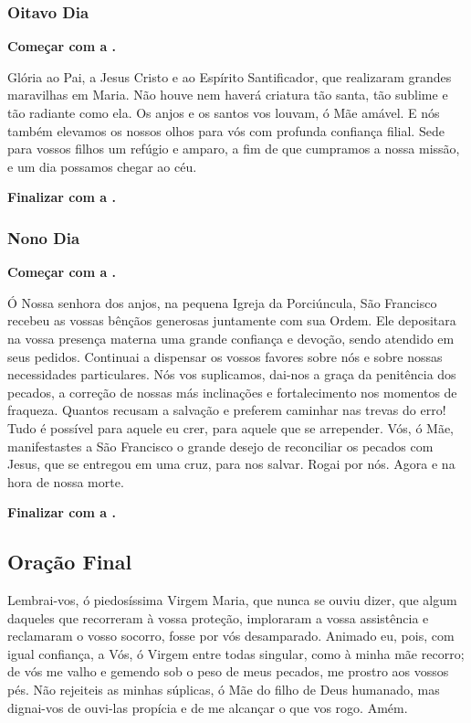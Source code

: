 \documentclass[a4paper,12pt]{extarticle} \usepackage[utf8]{inputenc}
\begin{document}
\subsubsection{Oitavo Dia}

\textbf{Começar com a .}


Glória ao Pai, a Jesus Cristo e ao Espírito Santificador, que realizaram grandes maravilhas em Maria. Não houve nem haverá criatura tão santa, tão sublime e tão radiante como ela. Os anjos e os santos vos louvam, ó Mãe amável. E nós também elevamos os nossos olhos para vós com profunda confiança filial. Sede para vossos filhos um refúgio e amparo, a fim de que cumpramos a nossa missão, e um dia possamos chegar ao céu.


\textbf{Finalizar com a .}


\subsubsection{Nono Dia}

\textbf{Começar com a .}

Ó Nossa senhora dos anjos, na pequena Igreja da Porciúncula, São Francisco recebeu as vossas bênçãos generosas juntamente com sua Ordem. Ele depositara na vossa presença materna uma grande confiança e devoção, sendo atendido em seus pedidos. Continuai a dispensar os vossos favores sobre nós e sobre nossas necessidades particulares. Nós vos suplicamos, dai-nos a graça da penitência dos pecados, a correção de nossas más inclinações e fortalecimento nos momentos de fraqueza. Quantos recusam a salvação e preferem caminhar nas trevas do erro! Tudo é possível para aquele eu crer, para aquele que se arrepender. Vós, ó Mãe, manifestastes a São Francisco o grande desejo de reconciliar os pecados com Jesus, que se entregou em uma cruz, para nos salvar. Rogai por nós. Agora e na hora de nossa morte.

\textbf{Finalizar com a .}

\newpage
\subsection{Oração Final} \label{oracao-final}

Lembrai-vos, ó piedosíssima Virgem Maria, que nunca se ouviu dizer, que algum daqueles que recorreram à vossa proteção, imploraram a vossa assistência e reclamaram o vosso socorro, fosse por vós desamparado. Animado eu, pois, com igual confiança, a Vós, ó Virgem entre todas singular, como à minha mãe recorro; de vós me valho e gemendo sob o peso de meus pecados, me prostro aos vossos pés. Não rejeiteis as minhas súplicas, ó Mãe do filho de Deus humanado, mas dignai-vos de ouvi-las propícia e de me alcançar o que vos rogo. Amém.
\end{document}

